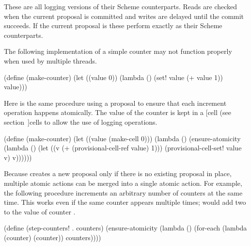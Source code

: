 \begin{protos}
\end{protos}
\noindent
These are all logging versions of their Scheme counterparts.
Reads are checked when the current proposal is committed and writes are
 delayed until the commit succeeds.
If the current proposal is  these perform exactly as their Scheme
 counterparts.

The following implementation of a simple counter may not function properly
 when used by multiple threads.
\begin{example}
(define (make-counter)
  (let ((value 0))
    (lambda ()
      (set! value (+ value 1))
      value)))
\end{example}

Here is the same procedure using a proposal to ensure that each
 increment operation happens atomically.
The value of the counter is kept in a
 [cell (see section~\Ref]{cells}
 to allow the use of
 logging operations.
\begin{example}
(define (make-counter)
  (let ((value (make-cell 0)))
    (lambda ()
      (ensure-atomicity
        (lambda ()
          (let ((v (+ (provisional-cell-ref value)
                      1)))
            (provisional-cell-set! value v)
            v))))))
\end{example}

Because  creates a new proposal only if there is
 no existing proposal in place, multiple atomic actions can be merged
 into a single atomic action.
For example, the following procedure increments an arbitrary number of
 counters at the same time.
This works even if the same counter appears multiple times;
  would add two to the value of counter .
\begin{example}
(define (step-counters! . counters)
  (ensure-atomicity
    (lambda ()
      (for-each (lambda (counter)
                  (counter))
                counters))))
\end{example}

